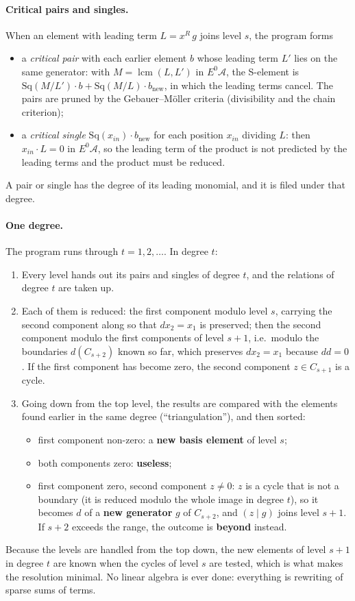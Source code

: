 \documentclass[11pt]{article}
\newcommand{\Sq}{\mathrm{Sq}}
\newcommand{\A}{\mathcal{A}}
\begin{document}
\paragraph{Critical pairs and singles.}
When an element with leading term $L = x^{R}\,g$ joins level $s$, the program forms
\begin{itemize}
\item a \emph{critical pair} with each earlier element $b$ whose leading term $L'$ lies on the
  same generator: with $M = \operatorname{lcm}(L, L')$ in $E^0\A$, the S-element is
  $\Sq(M/L')\cdot b + \Sq(M/L)\cdot b_{\text{new}}$, in which the leading terms cancel. The pairs
  are pruned by the Gebauer--Möller criteria (divisibility and the chain criterion);
\item a \emph{critical single} $\Sq(x_{in}) \cdot b_{\text{new}}$ for each position $x_{in}$
  dividing $L$: then $x_{in} \cdot L = 0$ in $E^0\A$, so the leading term of the product is not
  predicted by the leading terms and the product must be reduced.
\end{itemize}
A pair or single has the degree of its leading monomial, and it is filed under that degree.

\paragraph{One degree.}
The program runs through $t = 1, 2, \dots$. In degree $t$:
\begin{enumerate}
\item Every level hands out its pairs and singles of degree $t$, and the relations of degree $t$
  are taken up.
\item Each of them is reduced: the first component modulo level $s$, carrying the second component
  along so that $d x_2 = x_1$ is preserved; then the second component modulo the first components
  of level $s+1$, i.e.\ modulo the boundaries $d(C_{s+2})$ known so far, which preserves
  $d x_2 = x_1$ because $dd = 0$. If the first component has become zero, the second component
  $z \in C_{s+1}$ is a cycle.
\item Going down from the top level, the results are compared with the elements found earlier in
  the same degree (``triangulation''), and then sorted:
  \begin{itemize}
  \item first component non-zero: a \textbf{new basis element} of level $s$;
  \item both components zero: \textbf{useless};
  \item first component zero, second component $z \ne 0$: $z$ is a cycle that is not a boundary
    (it is reduced modulo the whole image in degree $t$), so it becomes $d$ of a
    \textbf{new generator} $g$ of $C_{s+2}$, and $(z \mid g)$ joins level $s+1$. If $s + 2$
    exceeds the range, the outcome is \textbf{beyond} instead.
  \end{itemize}
\end{enumerate}
Because the levels are handled from the top down, the new elements of level $s+1$ in degree $t$
are known when the cycles of level $s$ are tested, which is what makes the resolution minimal.
No linear algebra is ever done: everything is rewriting of sparse sums of terms.
\end{document}
